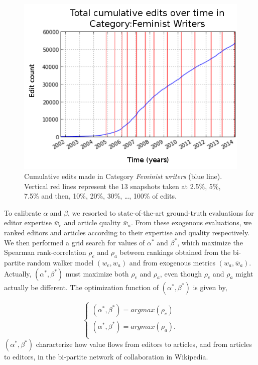 \begin{figure}[!t]
\centering
\includegraphics[width=0.9\columnwidth]{../Figures/cumulative_snapshots_Feminist_Writers_thirteen.png}
\caption{Cumulative edits made in Category {\it Feminist writers} (blue line). Vertical red lines represent the 13 snapshots taken at 2.5\%, 5\%, 7.5\% and then, 10\%, 20\%, 30\%, \ldots , 100\% of edits.}
\label{fig:snapshots}
\end{figure}

To calibrate $\alpha$ and $\beta$, we resorted to state-of-the-art ground-truth evaluations for editor expertise $\bar{w}_e$ and article quality $\bar{w}_a$. From these exogenous evaluations, we ranked editors and articles according to their expertise and quality respectively. We then performed  a grid search for values of $\alpha^*$ and $\beta^*$, which maximize the Spearman rank-correlation $\rho_e$ and $\rho_a$ between rankings obtained from the bi-partite random walker model $(w_e,w_a)$ and from exogenous metrics $(w_a,\bar{w}_a)$. Actually, $(\alpha^*,\beta^*)$ must maximize both $\rho_e$ and $\rho_a$, even though $\rho_e$ and $\rho_a$ might actually be different. The optimization function  of $(\alpha^*,\beta^*)$ is given by,

\begin{equation}
\begin{cases}
(\alpha^*,\beta^*) = argmax(\rho_e)\\
(\alpha^*,\beta^*) = argmax(\rho_a).\\
\end{cases}
\end{equation}
$(\alpha^*,\beta^*)$ characterize how value flows from editors to articles, and from articles to editors, in the bi-partite network of collaboration in Wikipedia.

